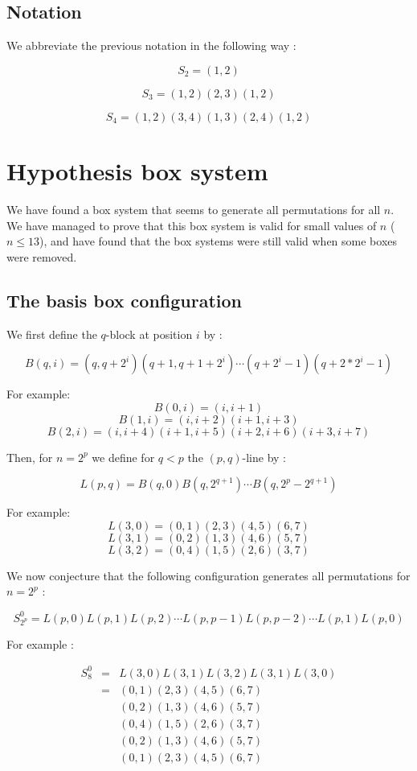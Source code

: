 \documentclass[11pt, a4paper]{article}
\begin{document}
\subsection {Notation}

We abbreviate the previous notation in the following way :

$$S_2 = (1,2)$$

$$S_3 = (1,2)(2,3)(1,2)$$

$$S_4 = (1,2)(3,4)(1,3)(2,4)(1,2)$$

\section{Hypothesis box system}

We have found a box system that seems to generate all permutations for all $n$.
We have managed to prove that this box system is valid for small values of $n$
($n \leq 13$), and have found that the box systems were still valid when some
boxes were removed.

\subsection{The basis box configuration}

We first define the $q$-block at position $i$ by :

$$B(q,i) = (q,q+2^i)(q+1,q+1+2^i)\cdots(q+2^i-1)(q+2*2^i-1)$$

For example: 
$$B(0,i) = (i,i+1)$$
$$B(1,i) = (i, i+2)(i+1, i+3)$$
$$B(2, i) = (i,i+4)(i+1,i+5)(i+2,i+6)(i+3,i+7)$$

Then, for $n=2^p$ we define for $q < p$ the $(p,q)$-line by :

$$L(p,q) = B(q,0) B(q,2^{q+1}) \cdots B(q,2^p-2^{q+1})$$

For example:
$$L(3,0) = (0,1)(2,3)(4,5)(6,7)$$
$$L(3,1) = (0,2)(1,3)(4,6)(5,7)$$
$$L(3,2) = (0,4)(1,5)(2,6)(3,7)$$

We now conjecture that the following configuration generates all permutations
for $n=2^p$ :

$$S_{2^p}^0 = L(p,0) L(p,1) L(p,2) \cdots L(p,p-1) L(p,p-2) \cdots L(p,1) L(p,0)$$

For example :

$$
\begin{aligned}
	S_8^0 & = & L(3,0) L(3,1) L(3,2) L(3,1) L(3,0) \\
        & = & (0,1)(2,3)(4,5)(6,7) \\
		& & (0,2)(1,3)(4,6)(5,7) \\
		& & (0,4)(1,5)(2,6)(3,7) \\
		& & (0,2)(1,3)(4,6)(5,7) \\
        & & (0,1)(2,3)(4,5)(6,7)
\end{aligned}$$
\end{document}
